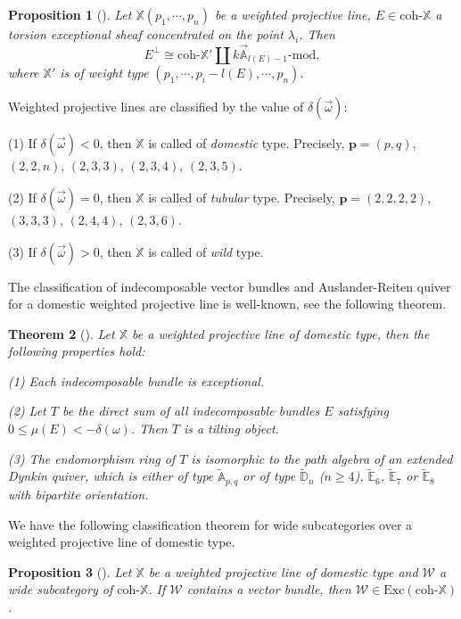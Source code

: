 \documentclass[a4paper, 11pt, reqno]{amsart}
\numberwithin{equation}{section}
\newtheorem{thm}{Theorem}[section]
\newtheorem{prop}[thm]{Proposition}
\theoremstyle{remark}
\theoremstyle{definition}
\begin{document}
\begin{prop} [{\cite[Proposition~6.5]{cheng2024wide}}] \label{prop tor perpendicular}
   Let $\mathbb X(p_1, \cdots, p_n)$ be a weighted projective line, $E \in \mathrm{coh} \text{-} \mathbb X$ a torsion exceptional sheaf concentrated on the point $\lambda_i$. Then 
   \[E^{\perp} \cong \mathrm{coh} \text{-} \mathbb X' \coprod k \vec{\mathbb A}_{l(E)-1} \text{-} \mathrm{mod},     \]
   where $\mathbb X'$ is of weight type $(p_1, \cdots, p_{i}-l(E), \cdots, p_n)$.
\end{prop}

Weighted projective lines are classified by the value of $\delta(\vec \omega)$:

(1) If $\delta(\vec \omega)<0$, then $\mathbb X$ is called of \emph{domestic} type. Precisely, $\bm{p}=(p,q)$, $(2,2,n)$, $(2,3,3)$, $(2,3,4)$, $(2,3,5)$.

(2) If $\delta(\vec \omega)=0$, then $\mathbb X$ is called of \emph{tubular} type. Precisely, $\bm{p}=(2,2,2,2)$, $(3,3,3)$, $(2,4,4)$, $(2,3,6)$.

(3) If $\delta(\vec \omega)>0$, then $\mathbb X$ is called of \emph{wild} type.

The classification of indecomposable vector bundles and Auslander-Reiten quiver for a domestic weighted projective line is well-known, see the following theorem.

\begin{thm}  [{\cite[Theorem~3.5]{lenzing2011weighted}}]\label{domestic}
   Let $\mathbb X$ be a weighted projective line of domestic type, then the following properties hold: 
   
   (1) Each indecomposable bundle is exceptional. 
   
   (2) Let $T$ be the direct sum of all indecomposable bundles $E$ satisfying $0 \leq \mu(E) < -\delta(\omega)$. Then $T$ is a tilting object.
   
   (3) The endomorphism ring of $T$ is isomorphic to the path algebra of an extended Dynkin quiver, which is either of type $\tilde{\mathbb A}_{p,q}$ or of type $\tilde{\mathbb D}_n$ ($n \geq 4$), $\tilde{\mathbb E}_6$, $\tilde{\mathbb E}_7$ or $\tilde{\mathbb E}_8$ with bipartite orientation.
\end{thm}

We have the following classification theorem for wide subcategories over a weighted projective line of domestic type.

\begin{prop} [{\cite[Proposition 7.1]{cheng2024wide}}] \label{thick_domestic_bundle}
   Let $\mathbb X$ be a weighted projective line of domestic type and $\mathcal W$ a wide subcategory of $\mathrm{coh} \text{-} \mathbb X$. If $\mathcal W$ contains a vector bundle, then $\mathcal W \in \mathrm{Exc}(\mathrm{coh} \text{-} \mathbb X)$.
\end{prop}
\end{document}
